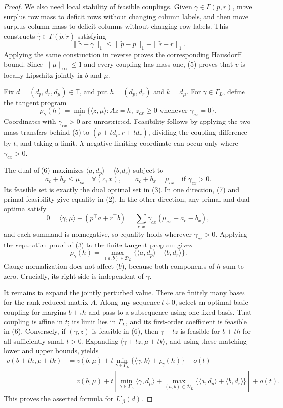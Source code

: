 \documentclass{article}
\begin{document}
\begin{proof}
We also need local stability of feasible couplings.  Given \(\gamma\in\Gamma(p,r)\), move surplus row mass to deficit rows without changing column labels, and then move surplus column mass to deficit columns without changing row labels.  This constructs \(\widetilde\gamma\in\Gamma(\widetilde p,\widetilde r)\) satisfying
\[
\|\widetilde\gamma-\gamma\|_1
\leq\|\widetilde p-p\|_1+\|\widetilde r-r\|_1.
\tag{5}
\]
Applying the same construction in reverse proves the corresponding Hausdorff bound.  Since \(\|\mu\|_\infty\leq1\) and every coupling has mass one, (5) proves that \(v\) is locally Lipschitz jointly in \(b\) and \(\mu\).

Fix \(d=(d_p,d_r,d_\mu)\in\mathbb T\), and put \(h=(d_p,d_r)\) and \(k=d_\mu\).  For \(\gamma\in\Gamma_L\), define the tangent program
\[
\rho_\gamma(h)=
\min_z\{\langle z,\mu\rangle:Az=h,\ 
z_{cx}\geq0\text{ whenever }\gamma_{cx}=0\}.
\tag{6}
\]
Coordinates with \(\gamma_{cx}>0\) are unrestricted.  Feasibility follows by applying the two mass transfers behind (5) to \((p+td_p,r+td_r)\), dividing the coupling difference by \(t\), and taking a limit.  A negative limiting coordinate can occur only where \(\gamma_{cx}>0\).

The dual of (6) maximizes \(\langle a,d_p\rangle+\langle b,d_r\rangle\) subject to
\[
a_c+b_x\leq\mu_{cx}\quad\forall(c,x),
\qquad
a_c+b_x=\mu_{cx}\quad\text{if }\gamma_{cx}>0.
\tag{7}
\]
Its feasible set is exactly the dual optimal set in (3).  In one direction, (7) and primal feasibility give equality in (2).  In the other direction, any primal and dual optima satisfy
\[
0=\langle\gamma,\mu\rangle-(p^\top a+r^\top b)
=\sum_{c,x}\gamma_{cx}(\mu_{cx}-a_c-b_x),
\tag{8}
\]
and each summand is nonnegative, so equality holds wherever \(\gamma_{cx}>0\).  Applying the separation proof of (3) to the finite tangent program gives
\[
\rho_\gamma(h)=
\max_{(a,b)\in\mathcal D_L}
\{\langle a,d_p\rangle+\langle b,d_r\rangle\}.
\tag{9}
\]
Gauge normalization does not affect (9), because both components of \(h\) sum to zero.  Crucially, its right side is independent of \(\gamma\).

It remains to expand the jointly perturbed value.  There are finitely many bases for the rank-reduced matrix \(A\).  Along any sequence \(t\downarrow0\), select an optimal basic coupling for margins \(b+th\) and pass to a subsequence using one fixed basis.  That coupling is affine in \(t\); its limit lies in \(\Gamma_L\), and its first-order coefficient is feasible in (6).  Conversely, if \((\gamma,z)\) is feasible in (6), then \(\gamma+tz\) is feasible for \(b+th\) for all sufficiently small \(t>0\).  Expanding \(\langle\gamma+tz,\mu+tk\rangle\), and using these matching lower and upper bounds, yields
\[
\begin{aligned}
v(b+th,\mu+tk)
&=v(b,\mu)
+t\min_{\gamma\in\Gamma_L}
\{\langle\gamma,k\rangle+\rho_\gamma(h)\}+o(t)\\
&=v(b,\mu)+t\left[
\min_{\gamma\in\Gamma_L}\langle\gamma,d_\mu\rangle
+\max_{(a,b)\in\mathcal D_L}
\{\langle a,d_p\rangle+\langle b,d_r\rangle\}\right]+o(t).
\end{aligned}
\tag{10}
\]
This proves the asserted formula for \(L'_\beta(d)\).


\end{proof}
\end{document}
